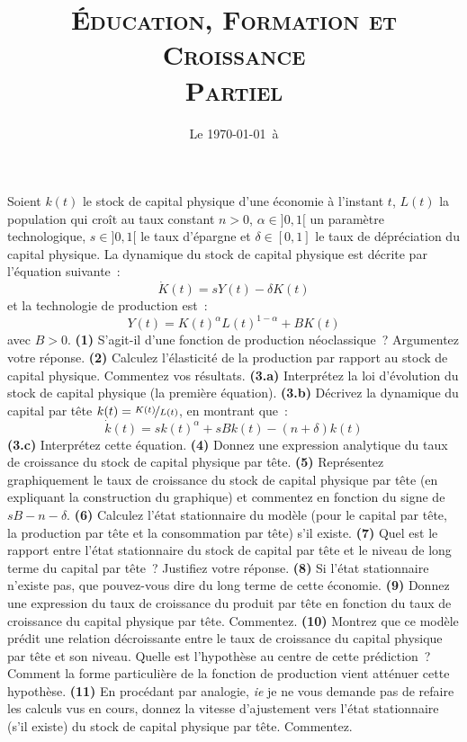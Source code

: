 \documentclass[10pt,a4paper,notitlepage]{article}
\newcommand{\question}[1]{\textbf{(#1)}}
\begin{document}
\title{\textsc{Éducation, Formation et Croissance\\ \small{Partiel}}}
\date{Le \today\ à \thistime}

\maketitle

Soient $k(t)$ le stock de capital physique d'une économie à l'instant
$t$, $L(t)$ la population qui croît au taux constant $n>0$,
$\alpha\in]0,1[$ un paramètre technologique, $s\in]0,1[$ le taux
d'épargne et $\delta\in[0,1]$ le taux de dépréciation du capital
physique. La dynamique du stock de capital physique est décrite par
l'équation suivante :
\[
\dot K(t) = sY(t)-\delta K(t)
\]
et la technologie de production est :
\[
Y(t) = K(t)^\alpha L(t)^{1-\alpha} + BK(t)
\]
avec $B>0$. \question{1} S'agit-il d'une fonction de production
néoclassique ? Argumentez votre réponse. \question{2} Calculez
l'élasticité de la production par rapport au stock de capital
physique. Commentez vos résultats. \question{3.a}
Interprétez la loi d'évolution du stock de capital physique (la
première équation). \question{3.b} Décrivez la dynamique du capital
par tête $k(t)=\nicefrac{K(t)}{L(t)}$, en montrant que :
\[
\dot k(t) = sk(t)^{\alpha}+sBk(t)-(n+\delta)k(t)
\]
\question{3.c} Interprétez cette équation. \question{4} Donnez une
expression analytique du taux de croissance du stock de capital
physique par tête. \question{5} Représentez graphiquement le taux de
croissance du stock de capital physique par tête (en expliquant la
construction du graphique) et commentez en fonction du signe de
$sB-n-\delta$. \question{6} Calculez l'état stationnaire du modèle
(pour le capital par tête, la production par tête et la consommation
par tête) s'il existe. \question{7} Quel est le rapport entre l'état
stationnaire du stock de capital par tête et le niveau de long terme
du capital par tête ? Justifiez votre réponse. \question{8} Si l'état
stationnaire n'existe pas, que pouvez-vous dire du long terme de cette
économie. \question{9} Donnez une expression du taux de croissance du
produit par tête en fonction du taux de croissance du capital physique
par tête. Commentez. \question{10} Montrez
que ce modèle prédit une relation décroissante entre le taux de
croissance du capital physique par tête et son niveau. Quelle est
l'hypothèse au centre de cette prédiction ? Comment la forme
particulière de la fonction de production vient atténuer cette
hypothèse. \question{11} En procédant par analogie, \emph{ie} je ne
vous demande pas de refaire les calculs vus en cours, donnez la
vitesse d'ajustement vers l'état stationnaire (s'il existe) du stock
de capital physique par tête. Commentez.
\end{document}
